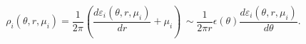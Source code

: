\begin{equation}
\rho _{i}(\theta ,r,\mu _{i})=\frac{1}{2\pi }\left( \frac{d\varepsilon
_{i}(\theta ,r,\mu _{i})}{dr}+\mu _{i}\right) \,\sim \frac{1}{2\pi r}%
\epsilon (\theta )\frac{d\varepsilon _{i}(\theta ,r,\mu _{i})}{d\theta }.
\label{rhoe}
\end{equation}%
